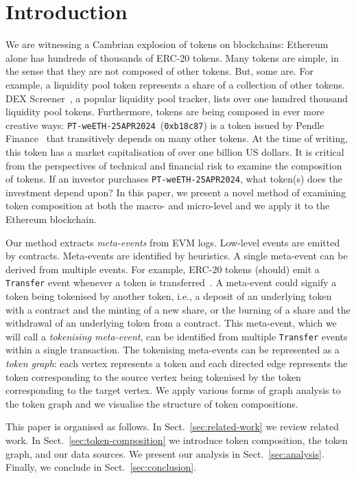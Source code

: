 \section{Introduction}\label{sec:introduction}

We are witnessing a Cambrian explosion of tokens on blockchains:
Ethereum alone has hundreds of thousands of ERC-20 tokens.  Many
tokens are simple, in the sense that they are not composed of other
tokens.  But, some are.  For example, a liquidity pool token
represents a share of a collection of other tokens.  DEX
Screener~\cite{dex-screener-xx}, a popular liquidity pool tracker,
lists over one hundred thousand liquidity pool tokens.  Furthermore,
tokens are being composed in ever more creative ways:
\texttt{PT-weETH-25APR2024}~(\texttt{0xb18c87}) is a token issued by
Pendle Finance~\cite{nguyen-vuong-22} that transitively depends on
many other tokens.  At the time of writing, this token has a market
capitalisation of over one billion US dollars.  It is critical from
the perspectives of technical and financial risk to examine the
composition of tokens.  If an investor purchases
\texttt{PT-weETH-25APR2024}, what token(s) does the investment depend
upon?  In this paper, we present a novel method of examining token
composition at both the macro- and micro-level and we apply it to the
Ethereum blockchain.


Our method extracts \textit{meta-events} from EVM logs.  Low-level
events are emitted by contracts.  Meta-events are identified by
heuristics.  A single meta-event can be derived from multiple events.
For example, ERC-20 tokens (should) emit a \texttt{Transfer} event
whenever a token is transferred~\cite{vogelsteller-buterin-15}.  A
meta-event could signify a token being tokenised by another token,
i.e., a deposit of an underlying token with a contract and the minting
of a new share, or the burning of a share and the withdrawal of an
underlying token from a contract.  This meta-event, which we will call
a \textit{tokenising meta-event}, can be identified from multiple
\texttt{Transfer} events within a single transaction.  The tokenising
meta-events can be represented as a \textit{token graph}: each vertex
represents a token and each directed edge represents the token
corresponding to the source vertex being tokenised by the token
corresponding to the target vertex.  We apply various forms of graph
analysis to the token graph and we visualise the structure of token
compositions.

This paper is organised as follows.  In Sect.~\ref{sec:related-work}
we review related work.  In Sect.~\ref{sec:token-composition} we
introduce token composition, the token graph, and our data sources.
We present our analysis in Sect.~\ref{sec:analysis}.  Finally, we
conclude in Sect.~\ref{sec:conclusion}.
